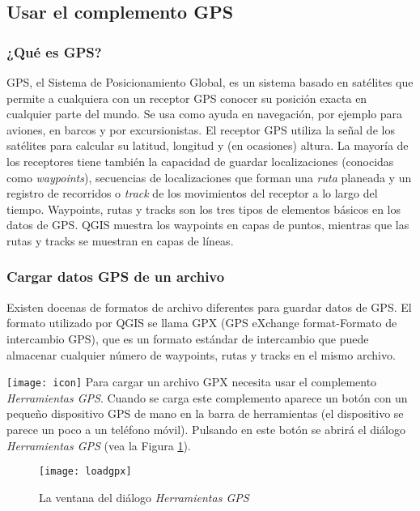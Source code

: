\subsection{Usar el complemento GPS}\label{label_plugingps}

\subsubsection{¿Qué es GPS?}\label{whatsgps}

GPS, el Sistema de Posicionamiento Global, es un sistema basado en satélites que permite a cualquiera con un receptor GPS conocer su posición exacta en cualquier parte del mundo. Se usa como ayuda en navegación, por ejemplo para aviones, en barcos y por excursionistas. El receptor GPS utiliza la señal de los satélites para calcular su latitud, longitud y (en ocasiones) altura. La mayoría de los receptores tiene también la capacidad de guardar localizaciones (conocidas como \emph{waypoints}), secuencias de localizaciones que forman una \emph{ruta} planeada y un registro de recorridos o \emph{track} de los movimientos del receptor a lo largo del tiempo. Waypoints, rutas y tracks son los tres tipos de elementos básicos en los datos de GPS. QGIS muestra los waypoints en capas de puntos, mientras que las rutas y tracks se muestran en capas de líneas.

\subsubsection{Cargar datos GPS de un archivo}\label{label_loadgps}

Existen docenas de formatos de archivo diferentes para guardar datos de GPS. El formato utilizado por QGIS se llama GPX (GPS eXchange format-Formato de intercambio GPS), que es un formato estándar de intercambio que puede almacenar cualquier número de waypoints, rutas y tracks en el mismo archivo.

\texttt{[image: icon]} Para cargar un archivo GPX necesita usar el complemento \emph{Herramientas GPS}. Cuando se carga este complemento aparece un botón con un pequeño dispositivo GPS de mano en la barra de herramientas (el dispositivo se parece un poco a un teléfono móvil). Pulsando en este botón se abrirá el diálogo \emph{Herramientas GPS} (vea la Figura \ref{figure GPX loader}).

\begin{figure}[ht]
   \begin{center}
\caption{\label{figure GPX loader}La ventana del diálogo \emph{Herramientas GPS}}
\texttt{[image: loadgpx]}
\end{center}
\end{figure}


